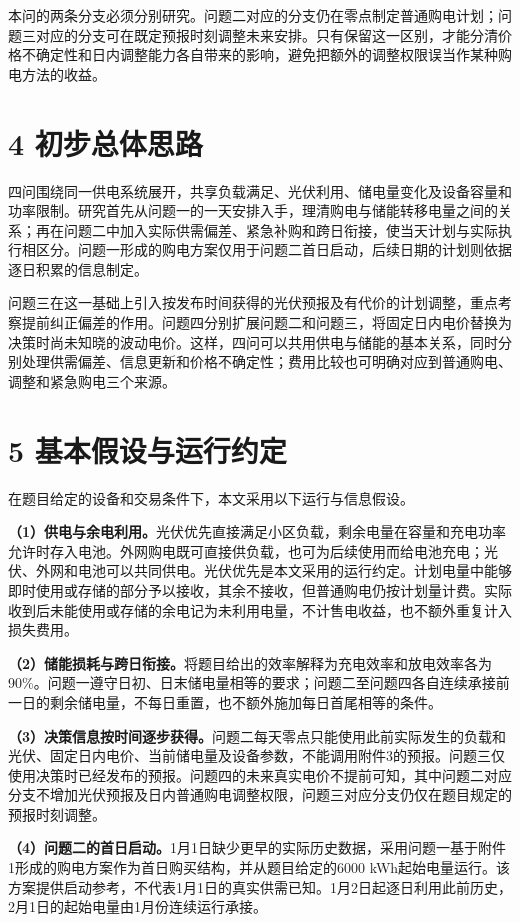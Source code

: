 \documentclass[11pt,a4paper]{article}
\begin{document}
本问的两条分支必须分别研究。问题二对应的分支仍在零点制定普通购电计划；问题三对应的分支可在既定预报时刻调整未来安排。只有保留这一区别，才能分清价格不确定性和日内调整能力各自带来的影响，避免把额外的调整权限误当作某种购电方法的收益。

\section*{4 初步总体思路}
四问围绕同一供电系统展开，共享负载满足、光伏利用、储电量变化及设备容量和功率限制。研究首先从问题一的一天安排入手，理清购电与储能转移电量之间的关系；再在问题二中加入实际供需偏差、紧急补购和跨日衔接，使当天计划与实际执行相区分。问题一形成的购电方案仅用于问题二首日启动，后续日期的计划则依据逐日积累的信息制定。

问题三在这一基础上引入按发布时间获得的光伏预报及有代价的计划调整，重点考察提前纠正偏差的作用。问题四分别扩展问题二和问题三，将固定日内电价替换为决策时尚未知晓的波动电价。这样，四问可以共用供电与储能的基本关系，同时分别处理供需偏差、信息更新和价格不确定性；费用比较也可明确对应到普通购电、调整和紧急购电三个来源。

\section*{5 基本假设与运行约定}
在题目给定的设备和交易条件下，本文采用以下运行与信息假设。

\textbf{（1）供电与余电利用。}光伏优先直接满足小区负载，剩余电量在容量和充电功率允许时存入电池。外网购电既可直接供负载，也可为后续使用而给电池充电；光伏、外网和电池可以共同供电。光伏优先是本文采用的运行约定。计划电量中能够即时使用或存储的部分予以接收，其余不接收，但普通购电仍按计划量计费。实际收到后未能使用或存储的余电记为未利用电量，不计售电收益，也不额外重复计入损失费用。

\textbf{（2）储能损耗与跨日衔接。}将题目给出的效率解释为充电效率和放电效率各为90\%。问题一遵守日初、日末储电量相等的要求；问题二至问题四各自连续承接前一日的剩余储电量，不每日重置，也不额外施加每日首尾相等的条件。

\textbf{（3）决策信息按时间逐步获得。}问题二每天零点只能使用此前实际发生的负载和光伏、固定日内电价、当前储电量及设备参数，不能调用附件3的预报。问题三仅使用决策时已经发布的预报。问题四的未来真实电价不提前可知，其中问题二对应分支不增加光伏预报及日内普通购电调整权限，问题三对应分支仍仅在题目规定的预报时刻调整。

\textbf{（4）问题二的首日启动。}1月1日缺少更早的实际历史数据，采用问题一基于附件1形成的购电方案作为首日购买结构，并从题目给定的6000 kWh起始电量运行。该方案提供启动参考，不代表1月1日的真实供需已知。1月2日起逐日利用此前历史，2月1日的起始电量由1月份连续运行承接。
\end{document}
